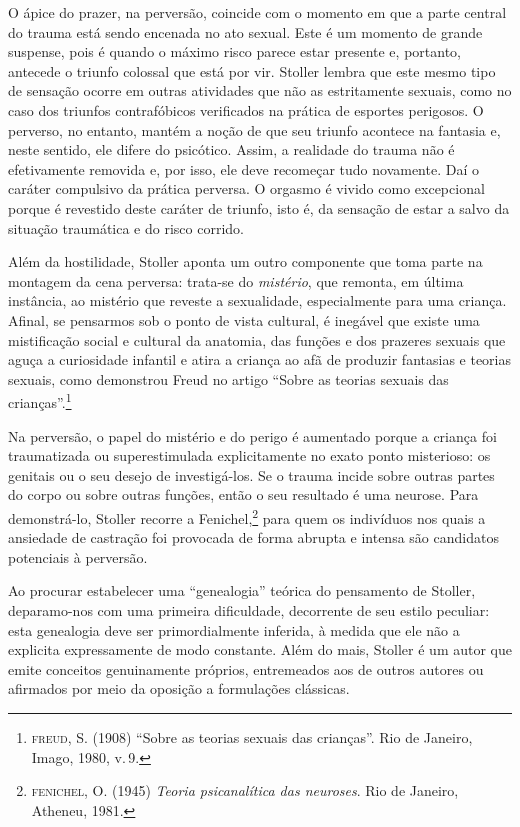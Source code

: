 O ápice do prazer, na perversão, coincide com o momento em que a parte
central do trauma está sendo encenada no ato sexual. Este é um momento
de grande suspense, pois é quando o máximo risco parece estar presente
e, portanto, antecede o triunfo colossal que está por vir. Stoller
lembra que este mesmo tipo de sensação ocorre em outras atividades que
não as estritamente sexuais, como no caso dos triunfos contrafóbicos
verificados na prática de esportes perigosos. O perverso, no entanto,
mantém a noção de que seu triunfo acontece na fantasia e, neste sentido,
ele difere do psicótico. Assim, a realidade do trauma não é efetivamente
removida e, por isso, ele deve recomeçar tudo novamente. Daí o caráter
compulsivo da prática perversa. O orgasmo é vivido como excepcional
porque é revestido deste caráter de triunfo, isto é, da sensação de
estar a salvo da situação traumática e do risco corrido.

Além da hostilidade, Stoller aponta um outro componente que toma parte
na montagem da cena perversa: trata-se do \emph{mistério}, que remonta,
em última instância, ao mistério que reveste a sexualidade,
especialmente para uma criança. Afinal, se pensarmos sob o ponto de
vista cultural, é inegável que existe uma mistificação social e cultural
da anatomia, das funções e dos prazeres sexuais que aguça a curiosidade
infantil e atira a criança ao afã de produzir fantasias e teorias
sexuais, como demonstrou Freud no artigo ``Sobre as teorias sexuais das
crianças''.\footnote{\textsc{freud}, S. (1908) ``Sobre as teorias
  sexuais das crianças''.  Rio de Janeiro, Imago, 1980, v.\,9.}

Na perversão, o papel do mistério e do perigo é aumentado porque a
criança foi traumatizada ou superestimulada explicitamente no exato
ponto misterioso: os genitais ou o seu desejo de investigá-los. Se o
trauma incide sobre outras partes do corpo ou sobre outras funções,
então o seu resultado é uma neurose. Para demonstrá-lo, Stoller recorre
a Fenichel,\footnote{\textsc{fenichel}, O. (1945) \emph{Teoria
  psicanalítica das neuroses}. Rio de Janeiro, Atheneu, 1981.} para quem
os indivíduos nos quais a ansiedade de castração foi provocada de forma
abrupta e intensa são candidatos potenciais à perversão.

Ao procurar estabelecer uma ``genealogia'' teórica do pensamento de
Stoller, deparamo-nos com uma primeira dificuldade, decorrente de seu
estilo peculiar: esta genealogia deve ser primordialmente inferida, à
medida que ele não a explicita expressamente de modo constante. Além do
mais, Stoller é um autor que emite conceitos genuinamente próprios,
entremeados aos de outros autores ou afirmados por meio da oposição a
formulações clássicas.

